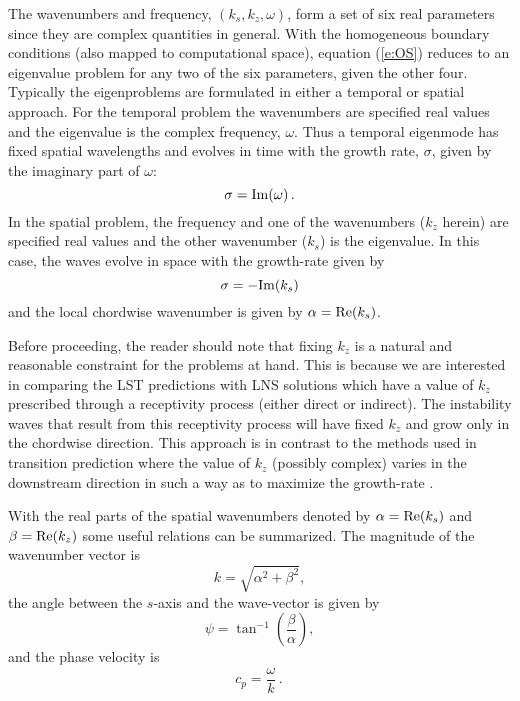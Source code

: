 The wavenumbers and frequency, $(k_s, k_z, \omega)$, form a set of six real
parameters since they are complex quantities in general.  With the homogeneous
boundary conditions (also mapped to computational space), equation
(\ref{e:OS}) reduces to an eigenvalue problem for any two of the six
parameters, given the other four.  Typically the eigenproblems are formulated
in either a temporal or spatial approach.  For the temporal problem the
wavenumbers are specified real values and the eigenvalue is the complex
frequency, $\omega$.  Thus a temporal eigenmode has fixed spatial wavelengths
and evolves in time with the growth rate, $\sigma$, given by the imaginary
part of $\omega$:
%
\begin{equation}
  \sigma = {\rm Im}(\omega) {\, .}
\end{equation}
%
In the spatial problem, the frequency and one of the wavenumbers ($k_z$
herein) are specified real values and the other wavenumber ($k_s$) is the
eigenvalue.  In this case, the waves evolve in space with the growth-rate
given by
%
\begin{equation}
  \sigma = -{\rm Im}(k_s) 
\end{equation}
%
and the local chordwise wavenumber is given by $\alpha = {\rm Re}(k_s)$.

Before proceeding, the reader should note that fixing $k_z$ is a natural and
reasonable constraint for the problems at hand.  This is because we are
interested in comparing the LST predictions with LNS solutions which have a
value of $k_z$ prescribed through a receptivity process (either direct or
indirect).  The instability waves that result from this receptivity process
will have fixed $k_z$ and grow only in the chordwise direction.  This approach
is in contrast to the methods used in transition prediction where the value of
$k_z$ (possibly complex) varies in the downstream direction in such a way as
to maximize the growth-rate \cite{Malik:90,Nayfeh:80}.

With the real parts of the spatial wavenumbers denoted by $\alpha={\rm
Re}(k_s)$ and $\beta={\rm Re}(k_z)$ some useful relations can be summarized.
The magnitude of the wavenumber vector is
%
\begin{equation}
  k = \sqrt{ \alpha^2 + \beta^2 } \comma
\end{equation}
%
the angle between the $s$-axis and the wave-vector is given by
%
\begin{equation}
  \psi = \tan^{-1}\left( \frac{\beta}{\alpha} \right) \comma
\end{equation}
%
and the phase velocity is
%
\begin{equation}
  c_p = \frac{\omega}{k} \period
\end{equation}

